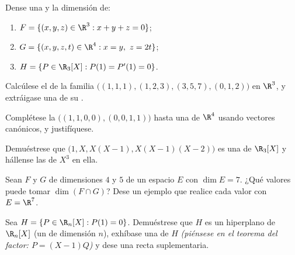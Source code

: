 \begin{exercise}[$\star$]\label{exo:b1:findim:1}
Dense una  y la dimensión de:
\begin{enumerate}
  \item $F = \{(x,y,z) \in \R^3 : x + y + z = 0\}$;
  \item $G = \{(x,y,z,t) \in \R^4 : x = y,\ z = 2t\}$;
  \item $H = \{P \in \R_3[X] : P(1) = P'(1) = 0\}$.
\end{enumerate}
\end{exercise}

\begin{exercise}[$\star$]\label{exo:b1:findim:2}
Calcúlese el  de la familia
$\bigl((1,1,1), (1,2,3), (3,5,7), (0,1,2)\bigr)$ en $\R^3$, y
extráigase una  de su .
\end{exercise}

\begin{exercise}[$\star$]\label{exo:b1:findim:3}
Complétese la  $\bigl((1,1,0,0), (0,0,1,1)\bigr)$ hasta
una  de $\R^4$ usando vectores canónicos, y justifíquese.
\end{exercise}

\begin{exercise}[$\star$]\label{exo:b1:findim:4}
Demuéstrese que $\bigl(1, X, X(X-1), X(X-1)(X-2)\bigr)$ es una 
de $\R_3[X]$ y hállense las  de $X^3$ en ella.
\end{exercise}

\begin{exercise}[$\star\star$]\label{exo:b1:findim:5}
Sean $F$ y $G$  de dimensiones $4$ y $5$ de un espacio $E$
con $\dim E = 7$. ¿Qué valores puede tomar $\dim(F \cap G)$? Dese un
ejemplo que realice cada valor con $E = \R^7$.
\end{exercise}

\begin{exercise}[$\star\star$]\label{exo:b1:findim:6}
Sea $H = \{P \in \R_n[X] : P(1) = 0\}$. Demuéstrese que $H$ es un
hiperplano de $\R_n[X]$ (un  de dimensión $n$), exhíbase
una  de $H$ \emph{(piénsese en el teorema del factor:
$P = (X-1)Q$)} y dese una recta suplementaria.
\end{exercise}

